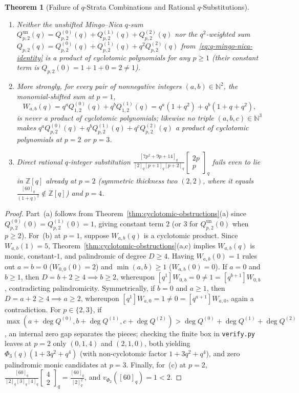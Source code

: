 \documentclass[11pt,a4paper]{article}
\newtheorem{theorem}{Theorem}[section]
\theoremstyle{definition}
\theoremstyle{remark}
\newcommand{\qbinom}[2]{\begin{bmatrix} #1 \\ #2 \end{bmatrix}_q}
\begin{document}
\begin{theorem}[Failure of $q$-Strata Combinations and Rational $q$-Substitutions]\label{thm:shifts}
\leavevmode
\begin{enumerate}
  \item[(a)] Neither the unshifted Mingo--Nica $q$-sum $Q^{\mathrm{un}}_{p,2}(q) = Q^{(0)}_{p,2}(q) + Q^{(1)}_{p,2}(q) + Q^{(2)}_{p,2}(q)$ nor the $q^2$-weighted sum $Q_{p,2}(q) = Q^{(0)}_{p,2}(q) + Q^{(1)}_{p,2}(q) + q^2 Q^{(2)}_{p,2}(q)$ from~\eqref{eq:q-mingo-nica-identity} is a product of cyclotomic polynomials for any $p \ge 1$ (their constant term is $Q_{p,2}(0) = 1 + 1 + 0 = 2 \neq 1$).
  \item[(b)] More strongly, for \emph{every} pair of nonnegative integers $(a,b) \in \mathbb{N}^2$, the monomial-shifted sum at $p = 1$,
  \[
    W_{a,b}(q) = q^a Q^{(0)}_{1,2}(q) + q^b Q^{(1)}_{1,2}(q) = q^a(1 + q^2) + q^b(1 + q + q^2),
  \]
  is never a product of cyclotomic polynomials; likewise no triple $(a,b,c) \in \mathbb{N}^3$ makes $q^a Q^{(0)}_{p,2}(q) + q^b Q^{(1)}_{p,2}(q) + q^c Q^{(2)}_{p,2}(q)$ a product of cyclotomic polynomials at $p = 2$ or $p = 3$.
  \item[(c)] Direct rational $q$-integer substitution $\frac{[7p^2+9p+14]_q}{[2]_q [p+1]_q [p+2]_q}\qbinom{2p}{p}$ fails even to lie in $\mathbb{Z}[q]$ already at $p = 2$ (symmetric thickness two $(2,2)$, where it equals $\frac{[60]_q}{(1+q)^2} \notin \mathbb{Z}[q]$) and $p = 4$.
\end{enumerate}
\end{theorem}

\begin{proof}
Part~(a) follows from Theorem~\ref{thm:cyclotomic-obstructions}(a) since $Q^{(0)}_{p,2}(0) = Q^{(1)}_{p,2}(0) = 1$, giving constant term $2$ (or $3$ for $Q^{\mathrm{un}}_{p,2}(0)$ when $p \ge 2$). For~(b) at $p = 1$, suppose $W_{a,b}(q)$ is a cyclotomic product. Since $W_{a,b}(1) = 5$, Theorem~\ref{thm:cyclotomic-obstructions}(a,c) implies $W_{a,b}(q)$ is monic, constant-$1$, and palindromic of degree $D \ge 4$. Having $W_{a,b}(0) = 1$ rules out $a = b = 0$ ($W_{0,0}(0) = 2$) and $\min(a,b) \ge 1$ ($W_{a,b}(0) = 0$). If $a = 0$ and $b \ge 1$, then $D = b + 2 \ge 4 \implies b \ge 2$, whereupon $[q^1]W_{0,b} = 0 \neq 1 = [q^{b+1}]W_{0,b}$, contradicting palindromicity. Symmetrically, if $b = 0$ and $a \ge 1$, then $D = a + 2 \ge 4 \implies a \ge 2$, whereupon $[q^1]W_{a,0} = 1 \neq 0 = [q^{a+1}]W_{a,0}$, again a contradiction. For $p \in \{2,3\}$, if $\max(a + \deg Q^{(0)}, b + \deg Q^{(1)}, c + \deg Q^{(2)}) > \deg Q^{(0)} + \deg Q^{(1)} + \deg Q^{(2)}$, an internal zero gap separates the pieces; checking the finite box in \texttt{verify.py} leaves at $p = 2$ only $(0,1,4)$ and $(2,1,0)$, both yielding $\Phi_3(q)(1 + 3q^2 + q^4)$ (with non-cyclotomic factor $1 + 3q^2 + q^4$), and zero palindromic monic candidates at $p = 3$. Finally, for~(c) at $p = 2$, $\frac{[60]_q}{[2]_q [3]_q [4]_q}\qbinom{4}{2} = \frac{[60]_q}{[2]_q^2}$, and $v_{\Phi_2}([60]_q) = 1 < 2$.
\end{proof}
\end{document}
